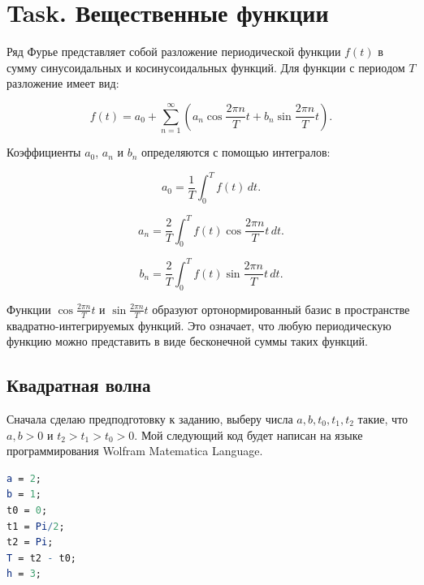\documentclass[a4paper,12pt]{article}
\begin{document}
\lstset{style=mystyle}



\section{Task. Вещественные функции}


Ряд Фурье представляет собой разложение периодической функции \( f(t) \) в сумму синусоидальных и косинусоидальных функций. Для функции с периодом \( T \) разложение имеет вид:

\begin{equation}
f(t) = a_0 + \sum_{n=1}^{\infty} \left( a_n \cos \frac{2\pi n}{T} t + b_n \sin \frac{2\pi n}{T} t \right).
\end{equation}


Коэффициенты \( a_0 \), \( a_n \) и \( b_n \) определяются с помощью интегралов:

\begin{equation}
a_0 = \frac{1}{T} \int_{0}^{T} f(t) \, dt.
\end{equation}

\begin{equation}
a_n = \frac{2}{T} \int_{0}^{T} f(t) \cos \frac{2\pi n}{T} t \, dt.
\end{equation}

\begin{equation}
b_n = \frac{2}{T} \int_{0}^{T} f(t) \sin \frac{2\pi n}{T} t \, dt.
\end{equation}

Функции \( \cos \frac{2\pi n}{T} t \) и \( \sin \frac{2\pi n}{T} t \) образуют ортонормированный базис в пространстве квадратно-интегрируемых функций. Это означает, что любую периодическую функцию можно представить в виде бесконечной суммы таких функций.

\subsection{Квадратная волна}

Сначала сделаю предподготовку к заданию, выберу числа \( a, b, t_0, t_1, t_2 \) такие, что \( a, b > 0 \) и \( t_2 > t_1 > t_0 > 0 \). Мой следующий код будет написан на языке программирования Wolfram Matematica Language.


\begin{lstlisting}[language=Mathematica, caption={Выбор чисел}]
a = 2;
b = 1;
t0 = 0;
t1 = Pi/2;
t2 = Pi;
T = t2 - t0;
h = 3;
\end{lstlisting}
\end{document}

